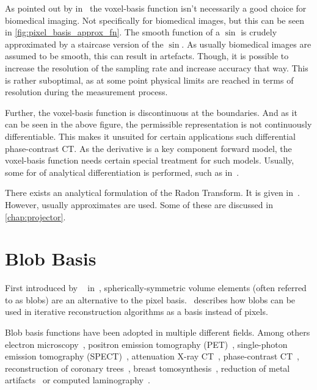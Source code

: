 As pointed out by \citeauthor*{lewitt_multidimensional_1990}
in~\cite{lewitt_multidimensional_1990,lewitt_alternatives_1992} the voxel-basis function isn't
necessarily a good choice for biomedical imaging. Not specifically for biomedical images, but this
can be seen in \autoref{fig:pixel_basis_approx_fn}. The smooth function of a \(\sin\) is crudely
approximated by a staircase version of the \(\sin\). As usually biomedical images are assumed to be
smooth, this can result in artefacts. Though, it is possible to increase the resolution of the
sampling rate and increase accuracy that way. This is rather suboptimal, as at some point physical
limits are reached in terms of resolution during the measurement process.

Further, the voxel-basis function is discontinuous at the boundaries. And as it can be seen in the
above figure, the permissible representation is not continuously differentiable. This makes it
unsuited for certain applications such differential phase-contrast CT. As the derivative is a key
component forward model, the voxel-basis function needs certain special treatment for such models.
Usually, some for of analytical differentiation is performed, such as
in~\cite{xu_investigation_2012}.

There exists an analytical formulation of the Radon Transform. It is given
in~\cite{toft_radon_1996}. However, usually approximates are used. Some of these are discussed in
\autoref{chap:projector}.

\section{Blob Basis}\label{sec:blob_basis}

First introduced by ~\citeauthor*{lewitt_multidimensional_1990}
in~\cite{lewitt_multidimensional_1990}, spherically-symmetric volume elements (often referred to as
blobs) are an alternative to the pixel basis.~\cite{lewitt_alternatives_1992} describes how blobs
can be used in iterative reconstruction algorithms as a basis instead of pixels.

Blob basis functions have been adopted in multiple different fields. Among others electron
microscopy~\cite{marabini_3d_1998, garduno_optimization_2001}, positron emission tomography
(PET)~\cite{jacobs_comparative_1999, chlewicki_noise_2004}, single-photon emission tomography
(SPECT)~\cite{wang_3d_2004, yendiki_comparison_2004}, attenuation X-ray
CT~\cite{jacobs_iterative_1999, carvalho_helical_2003, isola_motion-compensated_2008},
phase-contrast CT~\cite{kohler_iterative_2011, xu_investigation_2012}, reconstruction of coronary
trees~\cite{zhou_blob-based_2008}, breast tomosynthesis~\cite{wu_breast_2010}, reduction of metal
artifacts~\cite{levakhina_two-step_2010} or computed laminography~\cite{trampert_spherically_2017}.

